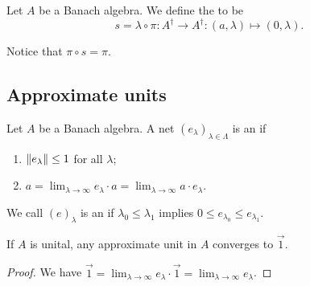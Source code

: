 \begin{definition}
Let $A$ be a Banach algebra. We define the  to be
\[ s = \lambda\circ \pi: A^\dagger \to A^\dagger: (a,\lambda) \mapsto (0,\lambda). \]
\end{definition}
Notice that $\pi\circ s = \pi$.

\subsection{Approximate units}
\begin{definition}
Let $A$ be a Banach algebra. A net $(e_\lambda)_{\lambda\in\Lambda}$ is an  if
\begin{enumerate}
\item $\lVert e_\lambda\rVert\leq 1$ for all $\lambda$;
\item $a = \lim_{\lambda\to \infty} e_\lambda \cdot a = \lim_{\lambda\to \infty} a \cdot e_\lambda$.
\end{enumerate}
We call $(e)_\lambda$ is an  if $\lambda_0 \leq \lambda_1$ implies $0\leq e_{\lambda_0} \leq e_{\lambda_1}$.
\end{definition}
\begin{lemma}
If $A$ is unital, any approximate unit in $A$ converges to $\vec{1}$.
\end{lemma}
\begin{proof}
We have $\vec{1} = \lim_{\lambda\to\infty}e_\lambda\cdot \vec{1} = \lim_{\lambda\to\infty}e_\lambda$.
\end{proof}

